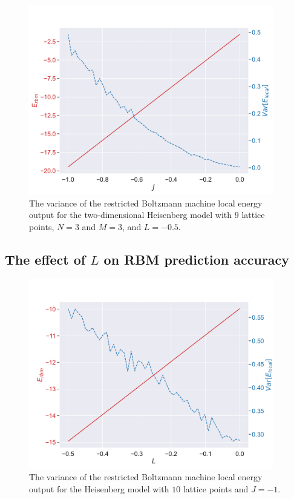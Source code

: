 \begin{figure}[H]
  \begin{center}
    \includegraphics[width=0.95\textwidth]{Figures/Plots/Heisen/[J][-1.0-0.0][e=500][n=9][N=3][M=3][L=-0.5]}
  \end{center}
  \caption{The variance of the restricted Boltzmann machine local energy output for the two-dimensional Heisenberg model with $9$ lattice points, $N=3$ and $M=3$, and $L=-0.5$.}
\end{figure}
\subsection{The effect of \texorpdfstring{$L$}{L} on RBM prediction accuracy}

\begin{figure}[H]
  \begin{center}
    \includegraphics[width=0.95\textwidth]{Figures/Plots/Heisen/[L][-0.5-0.0][e=500][n=10][N=10][M=1][J=-1]}
  \end{center}
  \caption{The variance of the restricted Boltzmann machine local energy output for the Heisenberg model with $10$ lattice points and $J=-1$.}
\end{figure}

